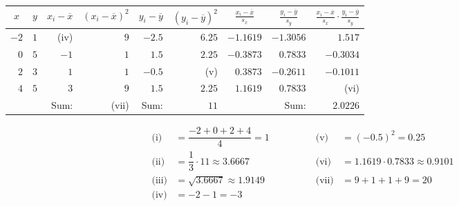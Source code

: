 \documentclass[12pt,letterpaper]{exam}
\begin{document}
\begin{questions}
\begin{parts}
\begin{table}[!ht]
\centering
\begin{tabular}{rrrrrrrrr}
\multicolumn{1}{c|}{$x$} & \multicolumn{1}{c|}{$y$} & \multicolumn{1}{c|}{$x_i - \overline{x}$} & \multicolumn{1}{c|}{$(x_i - \overline{x})^2$} & \multicolumn{1}{c|}{$y_i - \overline{y}$} & \multicolumn{1}{c|}{$(y_i - \overline{y})^2$} & \multicolumn{1}{c|}{$\frac{x_i - \overline{x}}{s_x}$} & \multicolumn{1}{c|}{$\frac{y_i - \overline{y}}{s_y}$} & \multicolumn{1}{c}{$\frac{x_i - \overline{x}}{s_x} \cdot \frac{y_i - \overline{y}}{s_y}$} \\ \hline
\multicolumn{1}{r|}{$-2$} & \multicolumn{1}{r|}{$1$} & \multicolumn{1}{r|}{(iv)} & \multicolumn{1}{r|}{$9$} & \multicolumn{1}{r|}{$-2.5$} & \multicolumn{1}{r|}{$6.25$} & \multicolumn{1}{r|}{$-1.1619$} & \multicolumn{1}{r|}{$-1.3056$} & $1.517$ \\
\multicolumn{1}{r|}{$0$} & \multicolumn{1}{r|}{$5$} & \multicolumn{1}{r|}{$-1$} & \multicolumn{1}{r|}{$1$} & \multicolumn{1}{r|}{$1.5$} & \multicolumn{1}{r|}{$2.25$} & \multicolumn{1}{r|}{$-0.3873$} & \multicolumn{1}{r|}{$0.7833$} & $-0.3034$ \\
\multicolumn{1}{r|}{$2$} & \multicolumn{1}{r|}{$3$} & \multicolumn{1}{r|}{$1$} & \multicolumn{1}{r|}{$1$} & \multicolumn{1}{r|}{$-0.5$} & \multicolumn{1}{r|}{(v)} & \multicolumn{1}{r|}{$0.3873$} & \multicolumn{1}{r|}{$-0.2611$} & $-0.1011$ \\
\multicolumn{1}{r|}{$4$} & \multicolumn{1}{r|}{$5$} & \multicolumn{1}{r|}{$3$} & \multicolumn{1}{r|}{$9$} & \multicolumn{1}{r|}{$1.5$} & \multicolumn{1}{r|}{$2.25$} & \multicolumn{1}{r|}{$1.1619$} & \multicolumn{1}{r|}{$0.7833$} & (vi) \\ \hline
\multicolumn{1}{l}{} & \multicolumn{1}{l}{} & Sum: & (vii) & Sum: & $11$ & \multicolumn{1}{l}{} & Sum: & $2.0226$
\end{tabular}
\end{table}

	\[
	\begin{aligned}
	\text{(i)}&= \dfrac{-2 + 0 + 2 + 4}{4}= 1 &\hspace{1cm}&& \text{(v)}&= (-0.5)^2= 0.25 \\[0.3cm]
	\text{(ii)}&= \dfrac{1}{3} \cdot 11 \approx 3.6667 &&& \text{(vi)}&= 1.1619 \cdot 0.7833 \approx 0.9101 \\[0.3cm]
	\text{(iii)}&= \sqrt{3.6667} \approx 1.9149 &&& \text{(vii)}&= 9 + 1 + 1 + 9= 20 \\[0.3cm]
	\text{(iv)}&= -2 - 1= -3
	\end{aligned}
	\]


\end{parts}
\end{questions}
\end{document}
